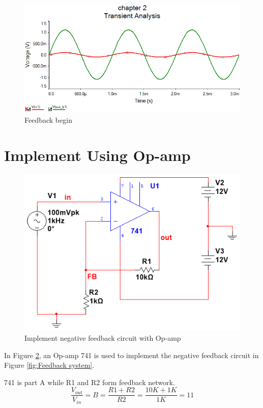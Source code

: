 \begin{figure}[htbp]
	\centering
	\includegraphics[scale=0.6]{"../Photo/Chap2/Feedback_ini_data"}
	\caption{Feedback begin}
	\label{fig:Feedback begin}
\end{figure}

\section{Implement Using Op-amp}


\begin{figure}[htbp]
	\centering
	\includegraphics[scale=0.6]{"../Photo/Chap2/Op-amp feedback"}
	\caption{Implement negative feedback circuit with Op-amp}
	\label{fig:Op-amp feedback}
\end{figure}


In Figure \ref{fig:Op-amp feedback}, an Op-amp 741 is used to implement the negative feedback circuit in Figure \ref{fig:Feedback system}.

741 is part A while R1 and R2 form feedback network. 
\[ \frac{V_{out}}{V_{in}} = B = \frac{R1 + R2}{R2} = \frac{10K + 1K}{1K} = 11 \]
 
